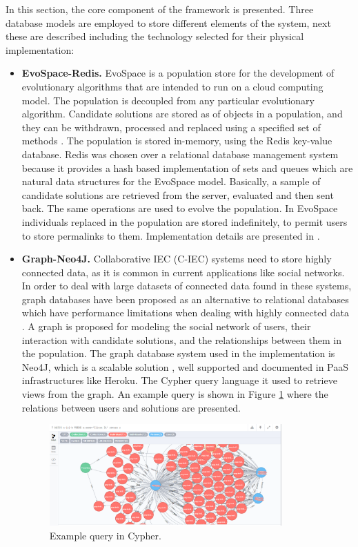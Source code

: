 In this section, the core component of the framework is presented.
Three database models are employed to store different elements of the system, next 
these are described including the technology selected for their physical implementation: 

\begin{itemize}
\item {\bf EvoSpace-Redis.} 
EvoSpace is a population store \cite{Evospace}  for the development of 
evolutionary algorithms that are intended to run on a cloud computing model. 
The population is decoupled from any particular evolutionary algorithm. 
Candidate solutions are stored as of objects in a population, and they can be withdrawn, 
processed and replaced using a specified set of methods \cite{GValdez2015}. The population
is stored in-memory, using the Redis key-value database. Redis was chosen over a relational 
database management system because it provides a hash based implementation of sets and 
queues which are natural data structures for the EvoSpace model. Basically, a sample of 
candidate solutions are retrieved from the server, evaluated and then sent back. 
The same operations are used to evolve the population. In EvoSpace individuals replaced 
in the population are stored indefinitely, to permit users to store permalinks to them.
Implementation details are presented in \cite{garcia2013evospace}.

\item {\bf Graph-Neo4J.} 
 Collaborative IEC (C-IEC) systems need to store highly connected data, as it is common 
 in current applications like social networks. In order to deal with large datasets of connected 
 data found in these systems, graph databases \cite{angles2012comparison} have been proposed 
 as an alternative to relational databases which have performance limitations when dealing with 
 highly connected data \cite{holzschuher2013performance}.
 A graph is proposed for modeling the social network of users, their interaction with 
 candidate solutions, and the relationships between them in the population.
 The graph database system used in the implementation is Neo4J, which is
 a scalable solution \cite{miller2013graph,holzschuher2013performance}, well 
 supported and documented in PaaS infrastructures like Heroku. The Cypher query 
 language it used to retrieve views from the graph.
 An example query is shown in Figure \ref{fig:cypher} where the relations 
 between users and solutions are presented.
  
  \begin{figure}[!t]
    \centering
        \includegraphics[width=3.5in]{img/gui-neo.png}
    \caption{Example query in Cypher.}
    \label{fig:cypher}
  \end{figure}


\end{itemize}
